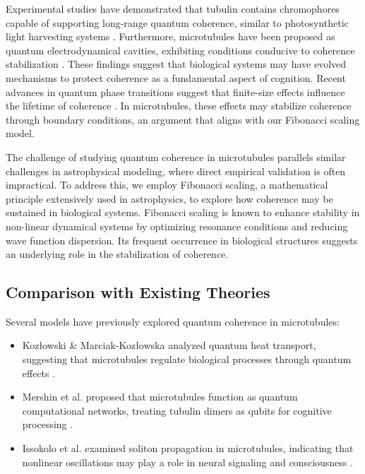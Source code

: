 Experimental studies have demonstrated that tubulin contains chromophores capable of supporting long-range quantum coherence, similar to photosynthetic light harvesting systems \cite{craddock_feasibility_2014}. Furthermore, microtubules have been proposed as quantum electrodynamical cavities, exhibiting conditions conducive to coherence stabilization \cite{mavromatos_quantum_2011}. These findings suggest that biological systems may have evolved mechanisms to protect coherence as a fundamental aspect of cognition. Recent advances in quantum phase transitions suggest that finite-size effects influence the lifetime of coherence \cite{pelissetto_scaling_2023}. In microtubules, these effects may stabilize coherence through boundary conditions, an argument that aligns with our Fibonacci scaling model.

The challenge of studying quantum coherence in microtubules parallels similar challenges in astrophysical modeling, where direct empirical validation is often impractical. To address this, we employ Fibonacci scaling, a mathematical principle extensively used in astrophysics, to explore how coherence may be sustained in biological systems. Fibonacci scaling is known to enhance stability in non-linear dynamical systems by optimizing resonance conditions and reducing wave function dispersion. Its frequent occurrence in biological structures suggests an underlying role in the stabilization of coherence.

\subsection{Comparison with Existing Theories}
Several models have previously explored quantum coherence in microtubules:
\begin{itemize}
\item Kozłowski \& Marciak-Kozłowska analyzed quantum heat transport, suggesting that microtubules regulate biological processes through quantum effects \cite{kozlowski_wave-gtdiffusion_2005}.
\item Mershin et al. proposed that microtubules function as quantum computational networks, treating tubulin dimers as qubits for cognitive processing \cite{mershin_quantum_2000}.
\item Issokolo et al. examined soliton propagation in microtubules, indicating that nonlinear oscillations may play a role in neural signaling and consciousness \cite{issokolo_localized_2024}.
\end{itemize}

